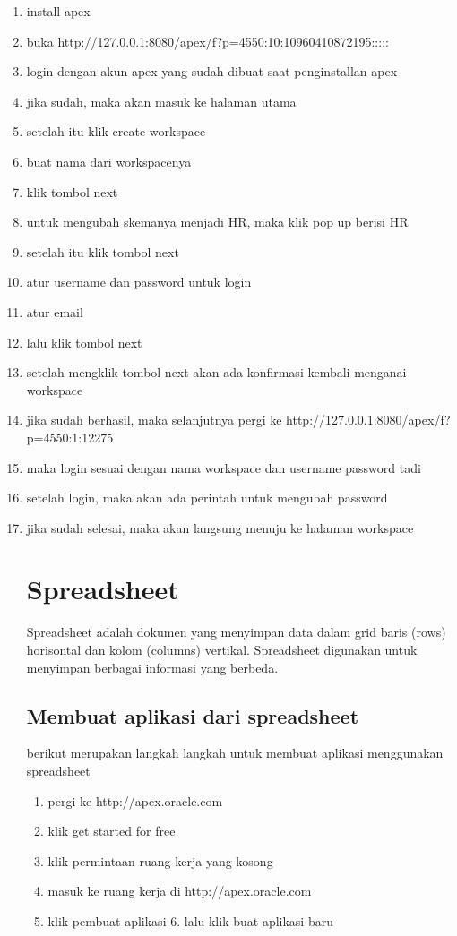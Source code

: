 \documentclass{article}
\begin{document}
\begin{enumerate}
    \item install apex
    \item buka http://127.0.0.1:8080/apex/f?p=4550:10:10960410872195:::::
    \item login dengan akun apex yang sudah dibuat saat penginstallan apex
    \item jika sudah, maka akan masuk ke halaman utama
    \item setelah itu klik create workspace
    \item buat nama dari workspacenya
    \item klik tombol next
    \item untuk mengubah skemanya menjadi HR, maka klik pop up berisi HR
    \item setelah itu klik tombol next
    \item atur username dan password untuk login
    \item atur email
    \item lalu klik tombol next
    \item setelah mengklik tombol next akan ada konfirmasi kembali menganai workspace
    \item jika sudah berhasil, maka selanjutnya pergi ke http://127.0.0.1:8080/apex/f?p=4550:1:12275
    \item maka login sesuai dengan nama workspace dan username password tadi
    \item setelah login, maka akan ada perintah untuk mengubah password
    \item jika sudah selesai, maka akan langsung menuju ke halaman workspace
    
\section{Spreadsheet}
Spreadsheet adalah dokumen yang menyimpan data dalam grid baris (rows) horisontal dan kolom (columns) vertikal. Spreadsheet digunakan untuk menyimpan berbagai informasi yang berbeda.
\subsection{Membuat aplikasi dari spreadsheet}
berikut merupakan langkah langkah untuk membuat aplikasi menggunakan spreadsheet
\begin{enumerate}
    \item pergi ke http://apex.oracle.com
    \item klik get started for free
    \item klik permintaan ruang kerja yang kosong
    \item masuk ke ruang kerja di http://apex.oracle.com
    \item klik pembuat aplikasi 6. lalu klik buat aplikasi baru

\end{enumerate}

\end{enumerate}
\end{document}
